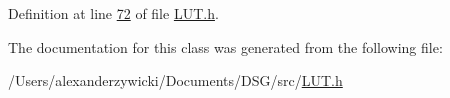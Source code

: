 Definition at line \hyperlink{_l_u_t_8h_source_l00072}{72} of file \hyperlink{_l_u_t_8h_source}{L\+U\+T.\+h}.



The documentation for this class was generated from the following file\+:\begin{DoxyCompactItemize}
\item 
/\+Users/alexanderzywicki/\+Documents/\+D\+S\+G/src/\hyperlink{_l_u_t_8h}{L\+U\+T.\+h}\end{DoxyCompactItemize}
